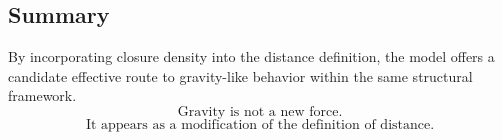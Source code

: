 \subsection{Summary}

By incorporating closure density into the distance definition, the model
offers a candidate effective route to gravity-like behavior within the same
structural framework.
\begin{equation}
  \boxed{\text{Gravity is not a new force.}}
\end{equation}
\begin{equation}
  \boxed{\text{It appears as a modification of the definition of distance.}}
\end{equation}
